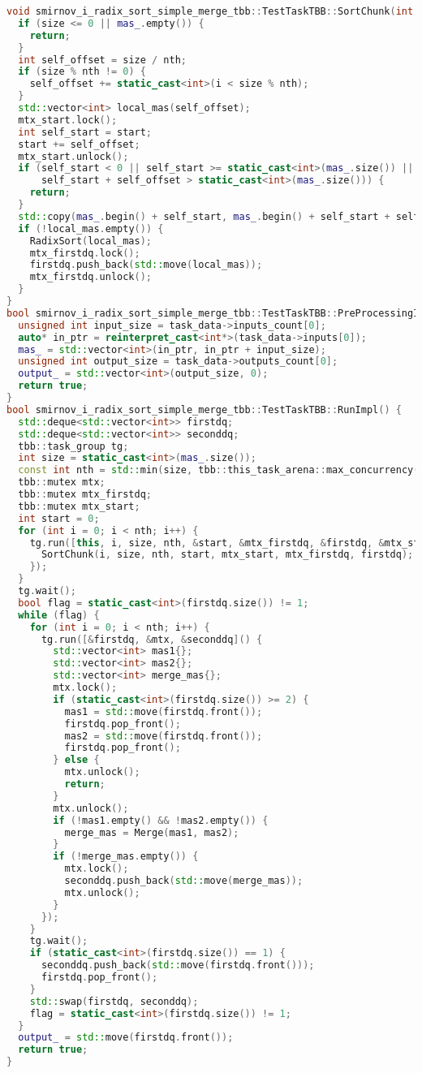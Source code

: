 \documentclass[a4paper,12pt]{article}
\begin{document}
\begin{lstlisting}[language=C++,caption={Фрагмент TBB-версии}]
void smirnov_i_radix_sort_simple_merge_tbb::TestTaskTBB::SortChunk(int i, int size, int nth, int& start, tbb::mutex& mtx_start, tbb::mutex& mtx_firstdq, std::deque<std::vector<int>>& firstdq) {
  if (size <= 0 || mas_.empty()) {
    return;
  }
  int self_offset = size / nth;
  if (size % nth != 0) {
    self_offset += static_cast<int>(i < size % nth);
  }
  std::vector<int> local_mas(self_offset);
  mtx_start.lock();
  int self_start = start;
  start += self_offset;
  mtx_start.unlock();
  if (self_start < 0 || self_start >= static_cast<int>(mas_.size()) || self_offset < 0 ||
      self_start + self_offset > static_cast<int>(mas_.size())) {
    return;
  }
  std::copy(mas_.begin() + self_start, mas_.begin() + self_start + self_offset, local_mas.begin());
  if (!local_mas.empty()) {
    RadixSort(local_mas);
    mtx_firstdq.lock();
    firstdq.push_back(std::move(local_mas));
    mtx_firstdq.unlock();
  }
}
bool smirnov_i_radix_sort_simple_merge_tbb::TestTaskTBB::PreProcessingImpl() {
  unsigned int input_size = task_data->inputs_count[0];
  auto* in_ptr = reinterpret_cast<int*>(task_data->inputs[0]);
  mas_ = std::vector<int>(in_ptr, in_ptr + input_size);
  unsigned int output_size = task_data->outputs_count[0];
  output_ = std::vector<int>(output_size, 0);
  return true;
}
bool smirnov_i_radix_sort_simple_merge_tbb::TestTaskTBB::RunImpl() {
  std::deque<std::vector<int>> firstdq;
  std::deque<std::vector<int>> seconddq;
  tbb::task_group tg;
  int size = static_cast<int>(mas_.size());
  const int nth = std::min(size, tbb::this_task_arena::max_concurrency());
  tbb::mutex mtx;
  tbb::mutex mtx_firstdq;
  tbb::mutex mtx_start;
  int start = 0;
  for (int i = 0; i < nth; i++) {
    tg.run([this, i, size, nth, &start, &mtx_firstdq, &firstdq, &mtx_start]() {
      SortChunk(i, size, nth, start, mtx_start, mtx_firstdq, firstdq);
    });
  }
  tg.wait();
  bool flag = static_cast<int>(firstdq.size()) != 1;
  while (flag) {
    for (int i = 0; i < nth; i++) {
      tg.run([&firstdq, &mtx, &seconddq]() {
        std::vector<int> mas1{};
        std::vector<int> mas2{};
        std::vector<int> merge_mas{};
        mtx.lock();
        if (static_cast<int>(firstdq.size()) >= 2) {
          mas1 = std::move(firstdq.front());
          firstdq.pop_front();
          mas2 = std::move(firstdq.front());
          firstdq.pop_front();
        } else {
          mtx.unlock();
          return;
        }
        mtx.unlock();
        if (!mas1.empty() && !mas2.empty()) {
          merge_mas = Merge(mas1, mas2);
        }
        if (!merge_mas.empty()) {
          mtx.lock();
          seconddq.push_back(std::move(merge_mas));
          mtx.unlock();
        }
      });
    }
    tg.wait();
    if (static_cast<int>(firstdq.size()) == 1) {
      seconddq.push_back(std::move(firstdq.front()));
      firstdq.pop_front();
    }
    std::swap(firstdq, seconddq);
    flag = static_cast<int>(firstdq.size()) != 1;
  }
  output_ = std::move(firstdq.front());
  return true;
}
\end{lstlisting}
\end{document}
